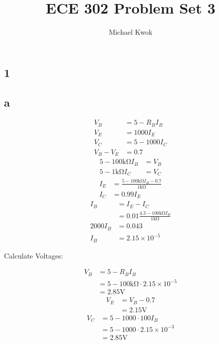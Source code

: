 \documentclass{article}
\title{ECE 302 Problem Set 3}
\author{Michael Kwok}
\begin{document}
\maketitle
\begin{multicols}{2}
    \section*{1}
    \subsection*{a}
    \begin{align*}
        V_B     & = 5- R_B I_B \\
        V_E     & = 1000 I_E   \\
        V_C     & = 5-1000 I_C \\
        V_B-V_E & = 0.7
    \end{align*}
    \begin{align*}
        5- 100\si{\kilo\ohm} I_B & = V_B \\
        5- 1\si{\kilo\ohm} I_C   & = V_C
    \end{align*}
    \begin{align*}
        I_E & = \frac{5 - 100\si{\kilo\ohm} I_B  - 0.7}{1\si{\kilo\ohm}} \\
        I_C & = 0.99 I_E
    \end{align*}
    \begin{align*}
        I_B      & =I_E - I_C                                                  \\
                 & = 0.01 \frac{4.3 - 100\si{\kilo\ohm} I_B }{1\si{\kilo\ohm}} \\
        2000 I_B & = 0.043                                                     \\
        I_B      & = 2.15\times 10^{-5}
    \end{align*}

    Calculate Voltages:

    \begin{align*}
        V_B & = 5- R_B I_B                                      \\
            & = 5- 100 \si{\kilo\ohm} \cdot 2.15 \times 10^{-5} \\
            & = \boxed{2.85 \si{\volt}}
    \end{align*}
    \begin{align*}
        V_E & = V_B - 0.7              \\
            & = \boxed{2.15\si{\volt}}
    \end{align*}
    \begin{align*}
        V_C & = 5 - 1000 \cdot 100 I_B            \\
            & = 5 - 1000 \cdot 2.15\times 10^{-3} \\
            & = \boxed{2.85 \si{\volt}}
    \end{align*}


\end{multicols}
\end{document}
